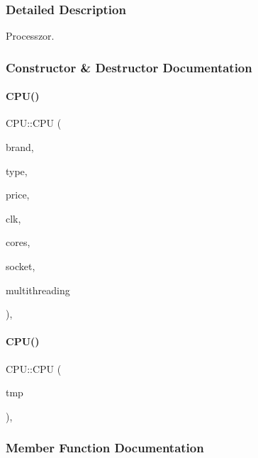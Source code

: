 \subsubsection{Detailed Description}
Processzor. 

\subsubsection{Constructor \& Destructor Documentation}
\mbox{\label{class_c_p_u_a1aa85a6c976fe5b665dcb9fd6d8fdd1e}} 
\paragraph{\texorpdfstring{CPU()}{CPU()}\hspace{0.1cm}{\footnotesize\ttfamily [1/2]}}
{\footnotesize\ttfamily C\+P\+U\+::\+C\+PU (\begin{DoxyParamCaption}\item[{\mbox{\hyperlink{class_string}{String}}}]{brand,  }\item[{\mbox{\hyperlink{class_string}{String}}}]{type,  }\item[{int}]{price,  }\item[{int}]{clk,  }\item[{int}]{cores,  }\item[{\mbox{\hyperlink{class_string}{String}}}]{socket,  }\item[{bool}]{multithreading }\end{DoxyParamCaption})\hspace{0.3cm}{\ttfamily [inline]}, {\ttfamily [explicit]}}

\mbox{\label{class_c_p_u_a9147d84f815b9a242ba618877e6b2673}} 
\paragraph{\texorpdfstring{CPU()}{CPU()}\hspace{0.1cm}{\footnotesize\ttfamily [2/2]}}
{\footnotesize\ttfamily C\+P\+U\+::\+C\+PU (\begin{DoxyParamCaption}\item[{\mbox{\hyperlink{struct_temp_input}{Temp\+Input}} \&}]{tmp }\end{DoxyParamCaption})\hspace{0.3cm}{\ttfamily [inline]}, {\ttfamily [explicit]}}



\subsubsection{Member Function Documentation}
\mbox{\label{class_c_p_u_ad4d3ebb288deeaad640e034bdb71a40a}} 
